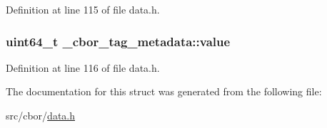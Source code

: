 Definition at line 115 of file data.\-h.

\hypertarget{struct__cbor__tag__metadata_a23bcf332e94e901e5bc3b48aab0d89da}{
\subsubsection[{value}]{\setlength{\rightskip}{0pt plus 5cm}uint64\-\_\-t \-\_\-cbor\-\_\-tag\-\_\-metadata\-::value}}\label{struct__cbor__tag__metadata_a23bcf332e94e901e5bc3b48aab0d89da}


Definition at line 116 of file data.\-h.



The documentation for this struct was generated from the following file\-:\begin{DoxyCompactItemize}
\item 
src/cbor/\hyperlink{data_8h}{data.\-h}\end{DoxyCompactItemize}
